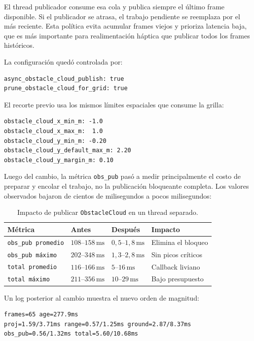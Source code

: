 El thread publicador consume esa cola y publica siempre el último frame
disponible. Si el publicador se atrasa, el trabajo pendiente se reemplaza por
el más reciente. Esta política evita acumular frames viejos y prioriza latencia
baja, que es más importante para realimentación háptica que publicar todos los
frames históricos.

La configuración quedó controlada por:

\begin{verbatim}
async_obstacle_cloud_publish: true
prune_obstacle_cloud_for_grid: true
\end{verbatim}

El recorte previo usa los mismos límites espaciales que consume la grilla:

\begin{verbatim}
obstacle_cloud_x_min_m: -1.0
obstacle_cloud_x_max_m:  1.0
obstacle_cloud_y_min_m: -0.20
obstacle_cloud_y_default_max_m: 2.20
obstacle_cloud_y_margin_m: 0.10
\end{verbatim}

Luego del cambio, la métrica \texttt{obs\_pub} pasó a medir principalmente el
costo de preparar y encolar el trabajo, no la publicación bloqueante completa.
Los valores observados bajaron de cientos de milisegundos a pocos
milisegundos:

\begin{table}[H]
\centering
\begin{tabular}{llll}
\toprule
\textbf{Métrica} & \textbf{Antes} & \textbf{Después} & \textbf{Impacto} \\
\midrule
\texttt{obs\_pub promedio} & $108$--$158\,\mathrm{ms}$ & $0{,}5$--$1{,}8\,\mathrm{ms}$ & Elimina el bloqueo \\
\texttt{obs\_pub máximo} & $202$--$348\,\mathrm{ms}$ & $1{,}3$--$2{,}8\,\mathrm{ms}$ & Sin picos críticos \\
\texttt{total promedio} & $116$--$166\,\mathrm{ms}$ & $5$--$16\,\mathrm{ms}$ & Callback liviano \\
\texttt{total máximo} & $211$--$356\,\mathrm{ms}$ & $10$--$29\,\mathrm{ms}$ & Bajo presupuesto \\
\bottomrule
\end{tabular}
\caption{Impacto de publicar \texttt{ObstacleCloud} en un thread separado.}
\label{tab:perf-obstaclecloud-async}
\end{table}

Un log posterior al cambio muestra el nuevo orden de magnitud:

\begin{verbatim}
frames=65 age=277.9ms
proj=1.59/3.71ms range=0.57/1.25ms ground=2.87/8.37ms
obs_pub=0.56/1.32ms total=5.60/10.68ms
\end{verbatim}

